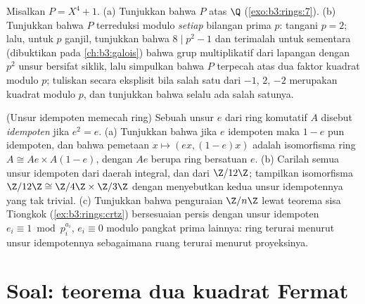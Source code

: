 \begin{exercise}[$\star\star\star$]\label{exo:b3:rings:11}
Misalkan $P = X^4 + 1$.
(a) Tunjukkan bahwa $P$  atas $\Q$
(\cref{exo:b3:rings:7}).
(b) Tunjukkan bahwa $P$ terreduksi modulo \emph{setiap} bilangan prima $p$:
tangani $p = 2$; lalu, untuk $p$ ganjil, tunjukkan bahwa $8 \mid p^2 - 1$ dan
terimalah untuk sementara (dibuktikan pada \cref{ch:b3:galois}) bahwa
grup multiplikatif dari lapangan dengan $p^2$ unsur bersifat siklik,
lalu simpulkan bahwa $P$ terpecah atas dua faktor kuadrat modulo $p$;
tuliskan secara eksplisit bila salah satu dari $-1$, $2$, $-2$ merupakan kuadrat modulo
$p$, dan tunjukkan bahwa selalu ada salah satunya.
\end{exercise}

\begin{exercise}[$\star\star$]\label{exo:b3:rings:12}
(Unsur idempoten memecah ring) Sebuah unsur $e$ dari ring komutatif
$A$ disebut \emph{idempoten} jika $e^2 = e$.
(a) Tunjukkan bahwa jika $e$ idempoten maka $1 - e$ pun idempoten, dan bahwa
pemetaan $x \mapsto (ex, (1-e)x)$ adalah isomorfisma ring $A
\cong Ae \times A(1-e)$, dengan $Ae$ berupa ring bersatuan $e$.
(b) Carilah semua unsur idempoten dari daerah integral, dan dari $\Z/12\Z$;
tampilkan isomorfisma $\Z/12\Z \cong \Z/4\Z \times \Z/3\Z$
dengan menyebutkan kedua unsur idempotennya yang tak trivial.
(c) Tunjukkan bahwa penguraian $\Z/n\Z$ lewat teorema sisa Tiongkok
(\cref{ex:b3:rings:crtz}) bersesuaian persis dengan
unsur idempoten $e_i \equiv 1 \bmod p_i^{a_i}$, $e_i \equiv 0$
modulo pangkat prima lainnya: ring terurai menurut unsur
idempotennya sebagaimana ruang terurai menurut proyeksinya.
\end{exercise}

\section{Soal: teorema dua kuadrat Fermat}

